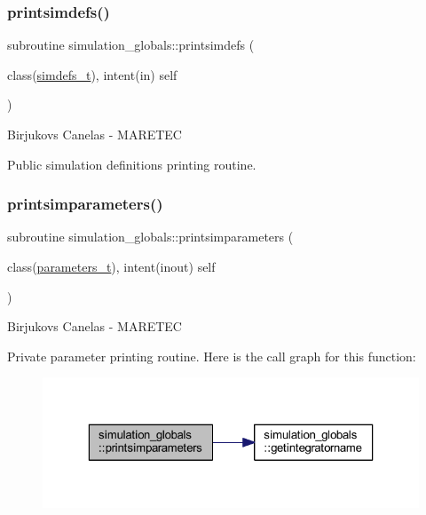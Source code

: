 \subsubsection{\texorpdfstring{printsimdefs()}{printsimdefs()}}
{\footnotesize\ttfamily subroutine simulation\+\_\+globals\+::printsimdefs (\begin{DoxyParamCaption}\item[{class(\mbox{\hyperlink{structsimulation__globals_1_1simdefs__t}{simdefs\+\_\+t}}), intent(in)}]{self }\end{DoxyParamCaption})\hspace{0.3cm}{\ttfamily [private]}}



Birjukovs Canelas -\/ M\+A\+R\+E\+T\+EC 

Public simulation definitions printing routine. \mbox{\label{namespacesimulation__globals_a0b17b2f2e9e7dbbad7c9d735217c1ee1}} 
\subsubsection{\texorpdfstring{printsimparameters()}{printsimparameters()}}
{\footnotesize\ttfamily subroutine simulation\+\_\+globals\+::printsimparameters (\begin{DoxyParamCaption}\item[{class(\mbox{\hyperlink{structsimulation__globals_1_1parameters__t}{parameters\+\_\+t}}), intent(inout)}]{self }\end{DoxyParamCaption})\hspace{0.3cm}{\ttfamily [private]}}



Birjukovs Canelas -\/ M\+A\+R\+E\+T\+EC 

Private parameter printing routine. Here is the call graph for this function\+:\nopagebreak
\begin{figure}[H]
\begin{center}
\leavevmode
\includegraphics[width=323pt]{namespacesimulation__globals_a0b17b2f2e9e7dbbad7c9d735217c1ee1_cgraph}
\end{center}
\end{figure}
\mbox{\label{namespacesimulation__globals_a1fc4653684d73efecdbd140b6cafe541}} 
